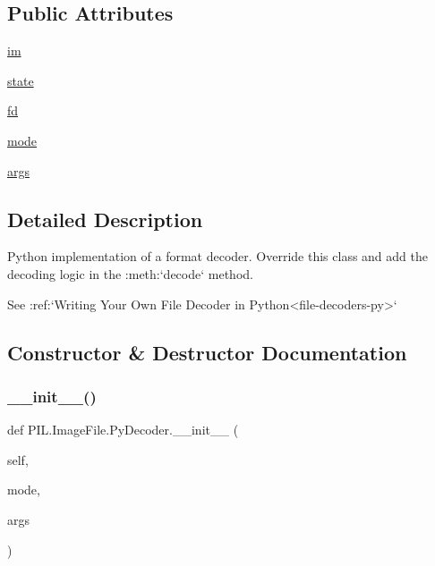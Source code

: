 \subsection*{Public Attributes}
\begin{DoxyCompactItemize}
\item 
\hyperlink{classPIL_1_1ImageFile_1_1PyDecoder_a7bfe7771a3780363e5c2ba80d9da95ea}{im}
\item 
\hyperlink{classPIL_1_1ImageFile_1_1PyDecoder_a50c5ab42a40adaf383653ca773b981c4}{state}
\item 
\hyperlink{classPIL_1_1ImageFile_1_1PyDecoder_a72d92b39bff0da0e60242edce04c37d6}{fd}
\item 
\hyperlink{classPIL_1_1ImageFile_1_1PyDecoder_a777846369024a113fd2afdaaa93a0a7b}{mode}
\item 
\hyperlink{classPIL_1_1ImageFile_1_1PyDecoder_a87bbe9fbb88f4a8150b93462c4242e61}{args}
\end{DoxyCompactItemize}


\subsection{Detailed Description}
\begin{DoxyVerb}Python implementation of a format decoder. Override this class and
add the decoding logic in the :meth:`decode` method.

See :ref:`Writing Your Own File Decoder in Python<file-decoders-py>`
\end{DoxyVerb}
 

\subsection{Constructor \& Destructor Documentation}
\mbox{\label{classPIL_1_1ImageFile_1_1PyDecoder_ac47fc20d88148418837a135a1ec24296}} 
\subsubsection{\texorpdfstring{\+\_\+\+\_\+init\+\_\+\+\_\+()}{\_\_init\_\_()}}
{\footnotesize\ttfamily def P\+I\+L.\+Image\+File.\+Py\+Decoder.\+\_\+\+\_\+init\+\_\+\+\_\+ (\begin{DoxyParamCaption}\item[{}]{self,  }\item[{}]{mode,  }\item[{}]{args }\end{DoxyParamCaption})}



